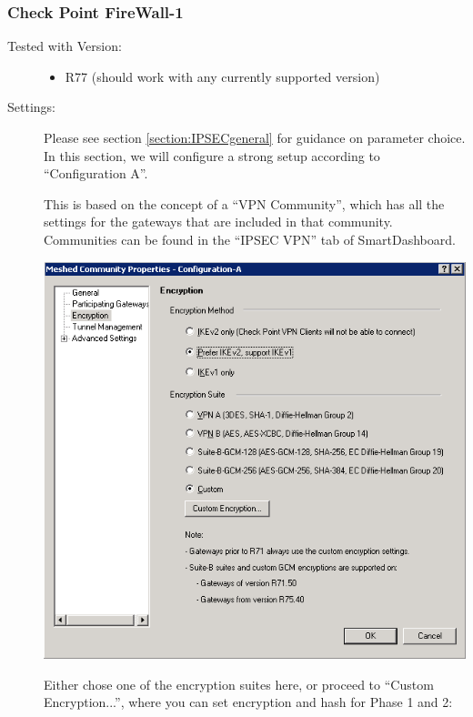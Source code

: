 \subsubsection{Check Point FireWall-1}
   
\begin{description}
\item[Tested with Version:] \mbox{}

\begin{itemize}
\item R77 (should work with any currently supported version)
\end{itemize}

\item[Settings:] \mbox{}

Please see section \ref{section:IPSECgeneral} for guidance on
parameter choice. In this section, we will configure a strong setup
according to ``Configuration A''.

This is based on the concept of a ``VPN Community'', which has all the
settings for the gateways that are included in that community.
Communities can be found in the ``IPSEC VPN'' tab of SmartDashboard.


\includegraphics{checkpoint_1.png}

Either chose one of the encryption suites here, or proceed to
``Custom Encryption...'', where you can set encryption and hash for
Phase 1 and 2:


\end{description}
